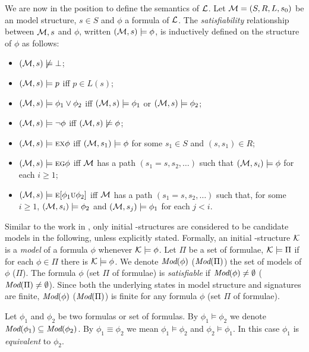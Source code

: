 \documentclass[letterpaper]{article} %
\begin{document}
We are now in the position to define the semantics of $\cal L$.
Let ${\cal M}=(S,R,L,s_0)$ be an model structure, $s\in S$ and $\phi$ a formula of $\cal L$.
The {\em satisfiability} relationship between ${\cal M},s$ and $\phi$,
written $({\cal M},s)\models\phi$, is inductively defined on the structure of $\phi$ as follows:
\begin{itemize}
  \item $({\cal M},s)\not\models\bot$;
  \item $({\cal M},s)\models p$ iff $p\in L(s)$;
  \item $({\cal M},s)\models \phi_1\lor\phi_2$ iff
    $({\cal M},s)\models \phi_1$ or $({\cal M},s)\models \phi_2$;
  \item $({\cal M},s)\models \neg\phi$ iff  $({\cal M},s)\not\models\phi$;
  \item $({\cal M},s)\models \textsc{e}\textsc{x}\phi$ iff
    $({\cal M},s_1)\models\phi$ for some $s_1\in S$ and $(s,s_1)\in R$;
  \item $({\cal M},s)\models \textsc{e}\textsc{g}\phi$ iff
    $\cal M$ has a path $(s_1=s,s_2,\ldots)$ such that
    $({\cal M},s_i)\models\phi$ for each $i\ge 1$;
  \item $({\cal M},s)\models \textsc{e}[\phi_1\textsc{u}\phi_2]$ iff
    $\cal M$ has a path $(s_1=s,s_2,\ldots)$ such that, for some $i\ge 1$,
    $({\cal M},s_i)\models\phi_2$ and
    $({\cal M},s_j)\models\phi_1$ for each $j<i$.
\end{itemize}

Similar to the work in \cite{DBLP:journals/tcs/BrowneCG88,Bolotov:1999:JETAI},
only initial \MPK-structures are considered to be candidate models
in the following, unless explicitly stated. Formally,
an initial \MPK-structure $\cal K$ is a {\em model} of a formula $\phi$
whenever ${\cal K}\models\phi$.
Let $\Pi$ be a set of formulae, ${\cal K} \models \Pi$ if for each $\phi\in \Pi$ there is $\cal K \models \phi$.
We denote $\textit{Mod}(\phi)$  ($\textit{Mod}(\Pi)$) the set of models of $\phi$ ($\Pi$).
The formula $\phi$ (set $\Pi$ of formulae) is {\em satisfiable}
if $\textit{Mod}(\phi)\neq\emptyset$ ($\textit{Mod}(\Pi)\neq\emptyset$).
Since both the underlying states in model structure and signatures are finite, $\textit{Mod}(\phi)$ ($\textit{Mod}(\Pi)$)
is finite for any formula $\phi$ (set $\Pi$ of formulae).

Let $\phi_1$ and $\phi_2$ be two formulas or set of formulas.
By $\phi_1\models\phi_2$ we denote $\textit{Mod}(\phi_1)\subseteq\textit{Mod}(\phi_2)$.
By $\phi_1\equiv\phi_2$ we mean $\phi_1\models\phi_2$ and $\phi_2\models\phi_1$.
In this case $\phi_1$ is {\em equivalent} to $\phi_2$.
\end{document}
